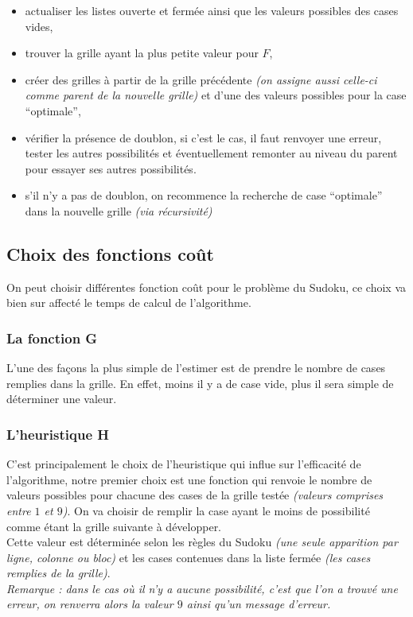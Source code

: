             \begin{itemize}
                \item actualiser les listes ouverte et fermée ainsi que les valeurs possibles des cases vides,
                \item trouver la grille ayant la plus petite valeur pour $F$,
                \item créer des grilles à partir de la grille précédente \textit{(on assigne aussi celle-ci comme parent de la nouvelle grille)} et d'une des valeurs possibles pour la case ``optimale'',
                \item vérifier la présence de doublon, si c'est le cas, il faut renvoyer une erreur, tester les autres possibilités et éventuellement remonter au niveau du parent pour essayer ses autres possibilités.
                \item s'il n'y a pas de doublon, on recommence la recherche de case ``optimale'' dans la nouvelle grille \textit{(via récursivité)}
            \end{itemize}
        \subsection{Choix des fonctions coût}
            On peut choisir différentes fonction coût pour le problème du Sudoku, ce choix va bien sur affecté le temps de calcul de l'algorithme.
            \subsubsection*{La fonction G}
                L'une des façons la plus simple de l'estimer est de prendre le nombre de cases remplies dans la grille. En effet, moins il y a de case vide, plus il sera simple de déterminer une valeur.
            \subsubsection*{L'heuristique H}
                C'est principalement le choix de l'heuristique qui influe sur l'efficacité de l'algorithme, notre premier choix est une fonction qui renvoie le nombre de valeurs possibles pour chacune des cases de la grille testée \textit{(valeurs comprises entre $1$ et $9$)}. On va choisir de remplir la case ayant le moins de possibilité comme étant la grille suivante à développer.\\
                Cette valeur est déterminée selon les règles du Sudoku \textit{(une seule apparition par ligne, colonne ou bloc)} et les cases contenues dans la liste fermée \textit{(les cases remplies de la grille)}.\\
                \textit{Remarque : dans le cas où il n'y a aucune possibilité, c'est que l'on a trouvé une erreur, on renverra alors la valeur $9$ ainsi qu'un message d'erreur.}
